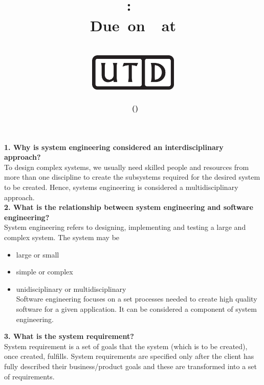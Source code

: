 \documentclass[12pt,letterpaper,titlepage,en-US]{article}
\title{
    \vspace{1in}
    \textmd{\textbf{\hmwkClassName \\\hmwkClass:\ \hmwkTitle }}\\
    \normalsize\vspace{0.1in}\small{Due\ on\ \DTMusedate{DueDate}\ at \DTMusetime{DueDate} }\\
    \vspace{0.1in}\large{\textit{\hmwkClassInstructor}}\\
    \vspace{0.5in}\includegraphics[height=2.4em]{UTD_logo_BW}\\
    \vspace{2in}
}
\author{\textbf{\hmwkAuthorName\ \footnotesize{(\hmwkAuthorNetID)}} \\ }
\date{}
\begin{document}
\maketitle





\textbf{1. Why is system engineering considered an interdisciplinary approach?}\\
To design complex systems, we usually need skilled people and resources from more than one discipline to create the subsystems required for the desired system to be created. Hence, systems engineering is considered a multidisciplinary approach.\\


\textbf{2. What is the relationship between system engineering and software engineering?}\\
System engineering refers to designing, implementing and testing a large and complex system. The system may be
\begin{itemize}
\item large or small
\item simple or complex
\item unidisciplinary or  multidisciplinary\\
Software engineering focuses on a set processes needed to create high quality software for a given application. It can be considered a component of system engineering.
\end{itemize}



 \textbf{3. What is the system requirement?}\\
  System requirement is a set of goals that the system (which is to be created), once created, fulfills. System requirements are specified only after the client has fully described their business/product goals and these are transformed into a set of requirements.
  
\end{document}
